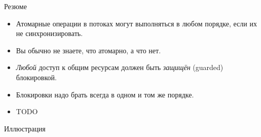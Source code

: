 \begin{frame}{Резюме}
	\begin{itemize}
		\item Атомарные операции в потоках могут выполняться в любом порядке, если их не синхронизировать.
		\item Вы обычно не знаете, что атомарно, а что нет.
		\item \textit{Любой} доступ к общим ресурсам должен быть \textit{защищён} (guarded) блокировкой.
		\item Блокировки надо брать всегда в одном и том же порядке.
		\item TODO
	\end{itemize}
\end{frame}

\begin{frame}{Иллюстрация}
	
\end{frame}
